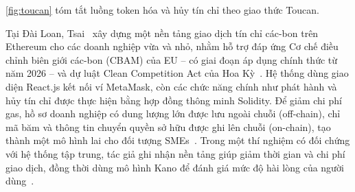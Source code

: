 \HinhToucan

\autoref{fig:toucan} tóm tắt luồng token hóa và hủy tín chỉ theo giao thức Toucan.

Tại Đài Loan, Tsai~\cite{tsai2024blockchain} xây dựng một nền tảng giao dịch tín chỉ các-bon trên Ethereum cho các doanh nghiệp vừa và nhỏ, nhằm hỗ trợ đáp ứng Cơ chế điều chỉnh biên giới các-bon (CBAM) của EU -- có giai đoạn áp dụng chính thức từ năm 2026 -- và dự luật Clean Competition Act của Hoa Kỳ~\cite{tsai2024blockchain}. Hệ thống dùng giao diện React.js kết nối ví MetaMask, còn các chức năng chính như phát hành và hủy tín chỉ được thực hiện bằng hợp đồng thông minh Solidity. Để giảm chi phí gas, hồ sơ doanh nghiệp có dung lượng lớn được lưu ngoài chuỗi (off-chain), chỉ mã băm và thông tin chuyển quyền sở hữu được ghi lên chuỗi (on-chain), tạo thành một mô hình lai cho đối tượng SMEs~\cite{tsai2024blockchain}. Trong một thí nghiệm có đối chứng với hệ thống tập trung, tác giả ghi nhận nền tảng giúp giảm thời gian và chi phí giao dịch, đồng thời dùng mô hình Kano để đánh giá mức độ hài lòng của người dùng~\cite{tsai2024blockchain}.

%
